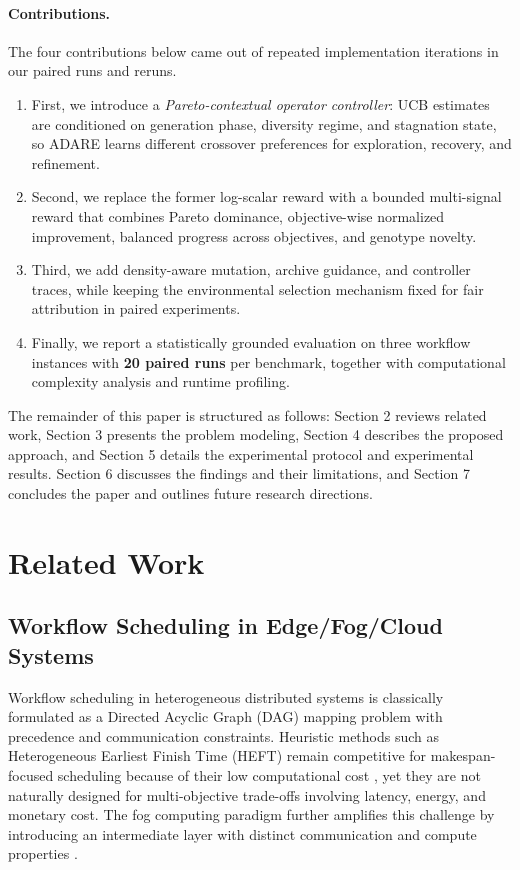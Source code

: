 \documentclass[runningheads]{llncs}
\begin{document}
\paragraph{Contributions.}
The four contributions below came out of repeated implementation iterations in our paired runs and reruns.
\begin{enumerate}
    \item First, we introduce a \emph{Pareto-contextual operator controller}: UCB estimates are conditioned on generation phase, diversity regime, and stagnation state, so ADARE learns different crossover preferences for exploration, recovery, and refinement.
    \item Second, we replace the former log-scalar reward with a bounded multi-signal reward that combines Pareto dominance, objective-wise normalized improvement, balanced progress across objectives, and genotype novelty.
    \item Third, we add density-aware mutation, archive guidance, and controller traces, while keeping the environmental selection mechanism fixed for fair attribution in paired experiments.
    \item Finally, we report a statistically grounded evaluation on three workflow instances with \textbf{20 paired runs} per benchmark, together with computational complexity analysis and runtime profiling.
\end{enumerate}

The remainder of this paper is structured as follows: Section 2 reviews related work, Section 3 presents the problem modeling, Section 4 describes the proposed approach, and Section 5 details the experimental protocol and experimental results. Section 6 discusses the findings and their limitations, and Section 7 concludes the paper and outlines future research directions.

\section{Related Work}
\subsection{Workflow Scheduling in Edge/Fog/Cloud Systems}
Workflow scheduling in heterogeneous distributed systems is classically formulated as a Directed Acyclic Graph (DAG) mapping problem with precedence and communication constraints. Heuristic methods such as Heterogeneous Earliest Finish Time (HEFT) remain competitive for makespan-focused scheduling because of their low computational cost \cite{topcuoglu2002heft}, yet they are not naturally designed for multi-objective trade-offs involving latency, energy, and monetary cost. The fog computing paradigm further amplifies this challenge by introducing an intermediate layer with distinct communication and compute properties \cite{bonomi2012fog}.
\end{document}
